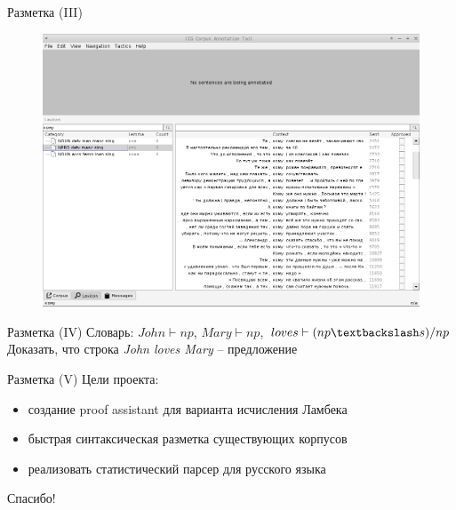 \documentclass{beamer}
\begin{document}
\begin{frame}{Разметка (III)}
\begin{center}
	\begin{figure}[H]
		\includegraphics[scale=0.285]{annotation2.png} 
	\end{figure}
\end{center}
\end{frame}

\begin{frame}{Разметка (IV)}
Словарь: {\small $John \vdash np$, $Mary \vdash np$, $loves \vdash (np \textbackslash s)/np$}\\
Доказать, что строка \textit{John loves Mary} -- предложение\\
\medskip

\begin{prooftree}
\end{prooftree}
\end{frame}

\begin{frame}{Разметка (V)}
Цели проекта:\\
\bigskip
\begin{itemize}
    \item создание proof assistant для варианта исчисления Ламбека
    \item быстрая синтаксическая разметка существующих корпусов
    \item реализовать статистический парсер для русского языка
\end{itemize}
\end{frame}

\begin{frame}{}
\begin{center}
Спасибо!
\end{center}
\end{frame}
\end{document}
